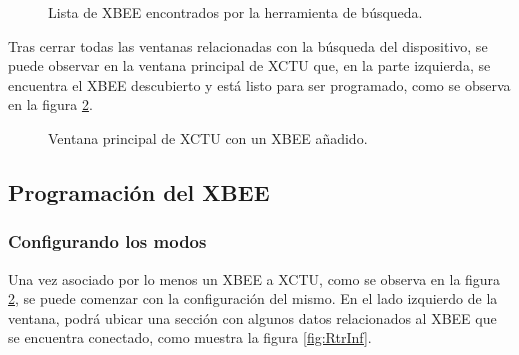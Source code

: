 \begin{figure}[H] %
\caption[1]{Lista de XBEE encontrados por la herramienta de búsqueda.}
\label{fig:DvF}
\end{figure}

Tras cerrar todas las ventanas relacionadas con la búsqueda del dispositivo, se puede observar en la ventana principal de XCTU que, en la parte izquierda, se encuentra el XBEE descubierto y está listo para ser programado, como se observa en la figura \ref{fig:XCTM}.

\begin{figure}[H] %
\caption[1]{Ventana principal de XCTU con un XBEE añadido.}
\label{fig:XCTM}
\end{figure}

\subsection{Programación del XBEE}
\subsubsection{Configurando los modos}\label{StartConf}
Una vez asociado por lo menos un XBEE a XCTU, como se observa en la figura \ref{fig:XCTM}, se puede comenzar con la configuración del mismo. En el lado izquierdo de la ventana, podrá ubicar una sección con algunos datos relacionados al XBEE que se encuentra conectado, como muestra la figura \ref{fig:RtrInf}. 

